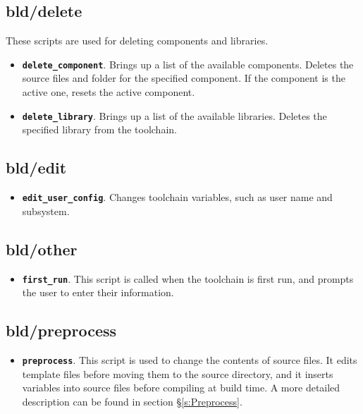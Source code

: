 \documentclass[a4paper, oneside, 11pt, titlepage, onecolumn, openright]{report}
\begin{document}
\subsection{bld/delete}
			\label{ss:bld/delete}
			These scripts are used for deleting components and libraries.
\begin{itemize}

\item \textbf{\texttt{delete\_component}}. Brings up a list of the available components. Deletes the source files and folder for the specified component. If the component is the active one, resets the active component.

\item \textbf{\texttt{delete\_library}}. Brings up a list of the available libraries. Deletes the specified library from the toolchain.

\end{itemize}

\subsection{bld/edit}
			\label{ss:bld/edit}
\begin{itemize}

\item \textbf{\texttt{edit\_user\_config}}. Changes toolchain variables, such as user name and subsystem.

\end{itemize}

\subsection{bld/other}
			\label{ss:bld/other}
\begin{itemize}

\item \textbf{\texttt{first\_run}}. This script is called when the toolchain is first run, and prompts the user to enter their information.

\end{itemize}

\subsection{bld/preprocess}
			\label{ss:bld/preprocess}
\begin{itemize}

\item \textbf{\texttt{preprocess}}. This script is used to change the contents of source files. It edits template files before moving them to the source directory, and it inserts variables into source files before compiling at build time. A more detailed description can be found in section \S\ref{s:Preprocess}.

\end{itemize}
\end{document}
